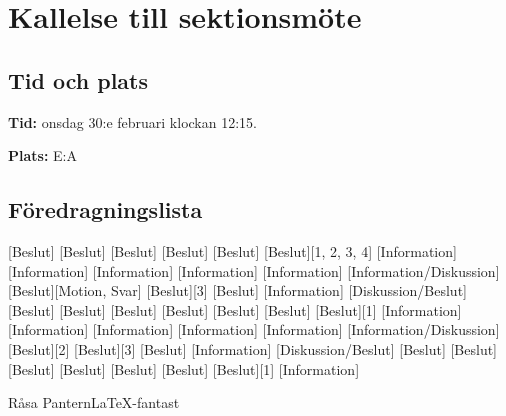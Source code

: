 \documentclass{dseknotice}
\begin{document}
\setdate{\today}

\section*{Kallelse till sektionsmöte \usemeeting}
\subsection*{Tid och plats}
\textbf{Tid:} onsdag 30:e februari klockan 12:15.

\textbf{Plats:} E:A


\subsection*{Föredragningslista}
\begin{agenda}
    [Beslut]
    [Beslut]
    [Beslut]
    [Beslut]
    [Beslut]
    [Beslut][1, 2, 3, 4]
    [Information]
    [Information]
    [Information]
    [Information]
    [Information]
    [Information/Diskussion]
    [Beslut][Motion, Svar]
    [Beslut][3]
    [Beslut]
    [Information]
    [Diskussion/Beslut]
    [Beslut]
    [Beslut]
    [Beslut]
    [Beslut]
    [Beslut]
    [Beslut]
    [Beslut][1]
    [Information]
    [Information]
    [Information]
    [Information]
    [Information]
    [Information/Diskussion]
    [Beslut][2]
    [Beslut][3]
    [Beslut]
    [Information]
    [Diskussion/Beslut]
    [Beslut]
    [Beslut]
    [Beslut]
    [Beslut]
    [Beslut]
    [Beslut]
    [Beslut][1]
    [Information]
\end{agenda}

\medskip

\signature{För D-sektionen, dag som ovan}{Råsa Pantern}{\LaTeX-fantast}
\end{document}
